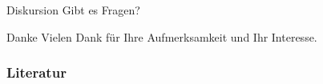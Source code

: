 \documentclass[fleqn,11pt,aspectratio=43]{beamer}
\begin{document}
%
%
%
%
%
%
%

\begin{frame}[highlight]{Diskursion}
\centering
Gibt es Fragen?
\end{frame}

\begin{frame}{Danke}
\centering
Vielen Dank für Ihre Aufmerksamkeit und Ihr Interesse.
\end{frame}

\begin{frame}[allowframebreaks]
\frametitle{Literatur}
%

\end{frame}
\end{document}
